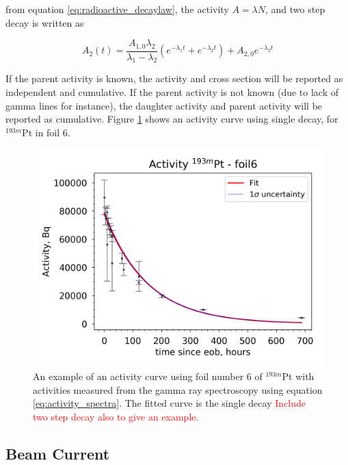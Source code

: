 \documentclass[a4paper,11pt,twoside]{book}
\begin{document}
\noindent from equation \ref{eq:radioactive_decaylaw}, the activity $A=\lambda N$, and two step decay is written as 

\begin{equation}
    A_2(t) = \frac{A_{1,0}\lambda_2}{\lambda_1-\lambda_2 } (e^{-\lambda_1 t} + e^{-\lambda_2 t }) + A_{2,0}e^{-\lambda_2 t}
\end{equation}

\noindent 
If the parent activity is known, the activity and cross section will be reported as independent and cumulative. If the parent activity is not known (due to lack of gamma lines for instance), the daughter activity and parent activity will be reported as cumulative. Figure \ref{fig:193mPt_activitycurve} shows an activity curve using single decay, for $^{193m}$Pt in foil 6. 

\begin{figure}
    \centering
    \includegraphics{Analysis/_activity_193mPt_677.png}
    \caption{An example of an activity curve using foil number 6 of $^{193m}$Pt with activities measured from the gamma ray spectroscopy using equation \ref{eq:activity_spectra}. The fitted curve is the single decay \textcolor{red}{Include two step decay also to give an example. } }  
    \label{fig:193mPt_activitycurve}
\end{figure}


\subsection{Beam Current}
\end{document}
